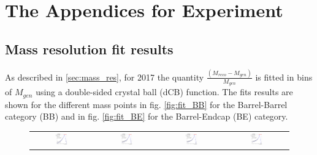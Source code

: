 \chapter{The Appendices for Experiment}\label{app:Exp}
\section{Mass resolution fit results}
\label{app:_mas_res}
As described in \ref{sec:mass_res}, for 2017 the quantity $\frac{(M_{reco} - M_{gen})}{M_{gen}}$ is fitted in bins of $M_{gen}$ using a double-sided crystal ball (dCB) function. The fits results are shown for the different mass points in fig. \ref{fig:fit_BB} for the Barrel-Barrel category (BB) and in fig. \ref{fig:fit_BE} for the Barrel-Endcap (BE) category.
\begin{figure}[ht]
  \begin{center}
    \begin{tabular}{cccc}
      \includegraphics[width=0.22\textwidth]{figures/Zprime/2017/mass_resolution/High_Mass/BB_120_200} &
      \includegraphics[width=0.22\textwidth]{figures/Zprime/2017/mass_resolution/High_Mass/BB_200_400}&
      \includegraphics[width=0.22\textwidth]{figures/Zprime/2017/mass_resolution/High_Mass/BB_400_800} &
      \includegraphics[width=0.22\textwidth]{figures/Zprime/2017/mass_resolution/High_Mass/BB_800_1400} \\

\end{tabular}
\end{center}
\end{figure}
